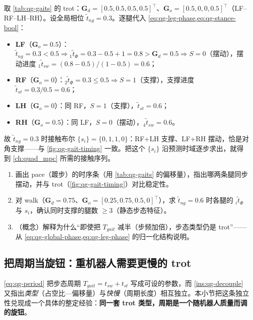 \begin{example}[读时序：trot 在 $\tilde t_{ng}=0.3$ 时各腿状态]\label{exam:qg-read-timing}
取 \cref{tab:qg-gaits} 的 trot：$\mathbf{G}_d=[0.5,0.5,0.5,0.5]^\top$、$\mathbf{G}_o=[0.5,0,0,0.5]^\top$（LF–RF–LH–RH）。设全局相位 $\tilde t_{ng}=0.3$。逐腿代入 \cref{eq:qg-leg-phase,eq:qg-stance-bool}：
\begin{itemize}
  \item \textbf{LF}（$\mathbf{G}_o=0.5$）：$\tilde t_{ng}=0.3<0.5\Rightarrow {}_1\tilde t_\Phi=0.3-0.5+1=0.8>\mathbf{G}_d=0.5\Rightarrow S=0$（摆动），摆动进度 ${}_1\tilde t_{sw}=(0.8-0.5)/(1-0.5)=0.6$；
  \item \textbf{RF}（$\mathbf{G}_o=0$）：${}_2\tilde t_\Phi=0.3\le0.5\Rightarrow S=1$（支撑），支撑进度 $\tilde t_{st}=0.3/0.5=0.6$；
  \item \textbf{LH}（$\mathbf{G}_o=0$）：同 RF，$S=1$（支撑），$\tilde t_{st}=0.6$；
  \item \textbf{RH}（$\mathbf{G}_o=0.5$）：同 LF，$S=0$（摆动），${}_4\tilde t_{sw}=0.6$。
\end{itemize}
故 $\tilde t_{ng}=0.3$ 时接触布尔 $\{s_i\}=\{0,1,1,0\}$：RF+LH 支撑、LF+RH 摆动，恰是对角支撑——与 \cref{fig:qg-gait-timing} 一致。把这个 $\{s_i\}$ 沿预测时域逐步求出，就得到 \cref{ch:quad_mpc} 所需的接触序列。
\end{example}

\begin{practice}
\begin{enumerate}
  \item 画出 pace（踱步）的时序条（用 \cref{tab:qg-gaits} 的偏移量），指出哪两条腿同步摆动，并与 trot（\cref{fig:qg-gait-timing}）对比稳定性。
  \item 对 walk（$\mathbf{G}_d=0.75$、$\mathbf{G}_o=[0.25,0.75,0.5,0]^\top$），求 $\tilde t_{ng}=0.6$ 时各腿的 ${}_i\tilde t_\Phi$ 与 $s_i$，确认同时支撑的腿数 $\ge3$（静态步态特征）。
  \item （概念）解释为什么“即使把 $T_{gait}$ 减半（步频加倍），步态类型仍是 trot”——从 \cref{eq:qg-global-phase,eq:qg-leg-phase} 的归一化结构说明。
\end{enumerate}
\end{practice}

\subsection{把周期当旋钮：重机器人需要更慢的 trot}
\label{subsec:qg-period-knob}

\cref{eq:qg-period} 把步态周期 $T_{gait}=t_{sw}+t_{st}$ 写成可设的参数，而 \cref{ins:qg-decouple} 又指出\emph{类型}（占空比—偏移量）与\emph{快慢}（周期长度）相互独立。本小节把这条独立性兑现成一个具体的整定经验：\textbf{同一套 trot 类型，周期是一个随机器人质量而调的旋钮}。

